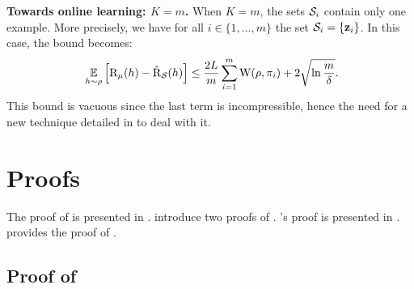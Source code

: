 \documentclass{article}
\begin{document}
\textbf{Towards online learning: $K=m$.} When $K=m$, the sets $\S_i$ contain only one example. 
More precisely, we have for all $i\in\{1,\dots,m\}$ the set $\S_i=\{\z_i\}$.
In this case, the bound becomes:
\begin{align*}
\ \EE_{h\sim\Q}\Big[ \Risk_{\D}(h) - \Riskhat_{\S}(h) \Big] \le \frac{2L}{m}\sum_{i=1}^{m}\W(\Q, \P_i) + 2\sqrt{\ln\frac{m}{\delta}}.
\end{align*}
This bound is vacuous since the last term is incompressible, hence the need for a new technique detailed in  to deal with it.

\section{Proofs}
\label{sec:proofs}

The proof of  is presented in . 
 introduce two proofs of .
's proof is presented in .
 provides the proof of .

\subsection{Proof of }
\label{sec:proof-supervised-ht}
\end{document}
